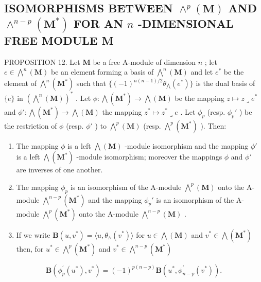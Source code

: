 \subsection{\texorpdfstring{ISOMORPHISMS BETWEEN \(\wedge^{p}(\mathbf{M})\) AND \(\wedge^{n - p}(\mathbf{M}^{*})\) FOR AN \(n\) -DIMENSIONAL FREE MODULE M}{ISOMORPHISMS BETWEEN \textbackslash wedge\^{}\{p\}(\textbackslash mathbf\{M\}) AND \textbackslash wedge\^{}\{n - p\}(\textbackslash mathbf\{M\}\^{}\{*\}) FOR AN n -DIMENSIONAL FREE MODULE M}}

PROPOSITION 12. Let \(\mathbf{M}\) be a free A-module of dimension \(n\) ; let \(e \in \bigwedge^{n}(\mathbf{M})\) be an element forming a basis of \(\bigwedge^{n}(\mathbf{M})\) and let \(e^{*}\) be the element of \(\bigwedge^{n}(\mathbf{M}^{*})\) such that \(\{(-1)^{n(n-1)/2} \theta_{\bigwedge}(e^{*})\}\) is the dual basis of \(\{e\}\) in \((\bigwedge^{n}(\mathbf{M}))^{*}\) . Let \(\phi: \bigwedge(\mathbf{M}^{*}) \to \bigwedge(\mathbf{M})\) be the mapping \(z \mapsto z \lrcorner e^{*}\) and \(\phi': \bigwedge(\mathbf{M}^{*}) \to \bigwedge(\mathbf{M})\) the mapping \(z^{*} \mapsto z^{*} \lrcorner e\) . Let \(\phi_{p}\) (resp. \(\phi_{p}'\) ) be the restriction of \(\phi\) (resp. \(\phi'\) ) to \(\bigwedge^{p}(\mathbf{M})\) (resp. \(\bigwedge^{p}(\mathbf{M}^{*})\) ). Then:

\begin{enumerate}
\def\labelenumi{(\roman{enumi})}
\item
  The mapping \(\phi\) is a left \(\bigwedge (\mathbf{M})\) -module isomorphism and the mapping \(\phi'\) is a left \(\bigwedge (\mathbf{M}^*)\) -module isomorphism; moreover the mappings \(\phi\) and \(\phi'\) are inverses of one another.
\item
  The mapping \(\phi_p\) is an isomorphism of the A-module \(\bigwedge^p (\mathbf{M})\) onto the A-module \(\bigwedge^{n - p}(\mathbf{M}^*)\) and the mapping \(\phi_p'\) is an isomorphism of the A-module \(\bigwedge^p (\mathbf{M}^*)\) onto the A-module \(\bigwedge^{n - p}(\mathbf{M})\) .
\item
  If we write \(\mathbf{B}(u,v^{*}) = \langle u,\theta_{\wedge}(v^{*})\rangle\) for \(u\in \bigwedge (\mathbf{M})\) and \(v^{*}\in \bigwedge (\mathbf{M}^{*})\) then, for \(u^{*}\in \bigwedge^{p}(\mathbf{M}^{*})\) and \(v^{*}\in \bigwedge^{n - p}(\mathbf{M}^{*})\)
\end{enumerate}

\[
\mathbf {B} \left(\phi_ {p} ^ {\prime} (u ^ {*}), v ^ {*}\right) = (- 1) ^ {p (n - p)} \mathbf {B} \left(u ^ {*}, \phi_ {n - p} ^ {\prime} (v ^ {*})\right).\tag{77}
\]

